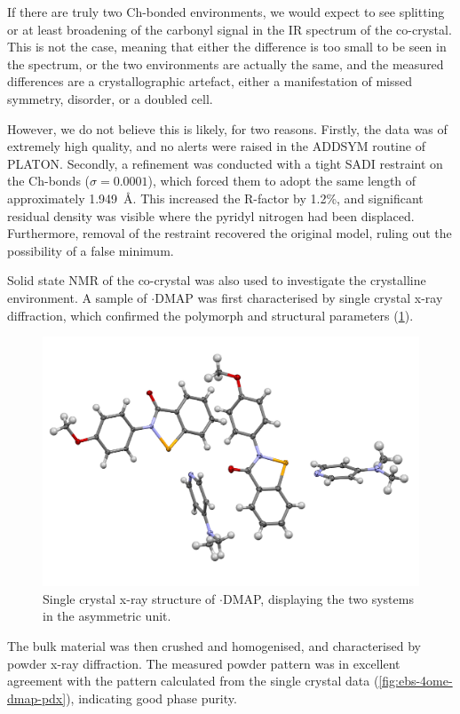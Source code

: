 \begin{refsection}
If there are truly two Ch-bonded environments, we would expect to see splitting or at least broadening of the carbonyl signal in the IR spectrum of the co-crystal.
This is not the case, meaning that either the difference is too small to be seen in the spectrum, or the two environments are actually the same, and the measured differences are a crystallographic artefact, either a manifestation of missed symmetry, disorder, or a doubled cell.

However, we do not believe this is likely, for two reasons.
Firstly, the data was of extremely high quality, and no alerts were raised in the ADDSYM routine of PLATON.
Secondly, a refinement was conducted with a tight SADI restraint on the Ch-bonds ($\sigma=0.0001$), which forced them to adopt the same length of approximately 1.949~\AA.
This increased the R-factor by 1.2\%, and significant residual density was visible where the pyridyl nitrogen had been displaced.
Furthermore, removal of the restraint recovered the original model, ruling out the possibility of a false minimum.

Solid state NMR of the co-crystal was also used to investigate the crystalline environment.
A sample of $\cdot$DMAP was first characterised by single crystal x-ray diffraction, which confirmed the polymorph and structural parameters (\cref{fig:ebs-4ome-dmap-xray}).

\begin{figure}
  \centering
  \includegraphics[width=0.8\linewidth]{Figures/ebs-4ome-dmap-xray.pdf}
  \caption{Single crystal x-ray structure of $\cdot$DMAP, displaying the two systems in the asymmetric unit.}
  \label{fig:ebs-4ome-dmap-xray}
\end{figure}

The bulk material was then crushed and homogenised, and characterised by powder x-ray diffraction.
The measured powder pattern was in excellent agreement with the pattern calculated from the single crystal data (\cref{fig:ebs-4ome-dmap-pdx}), indicating good phase purity.


\end{refsection}

